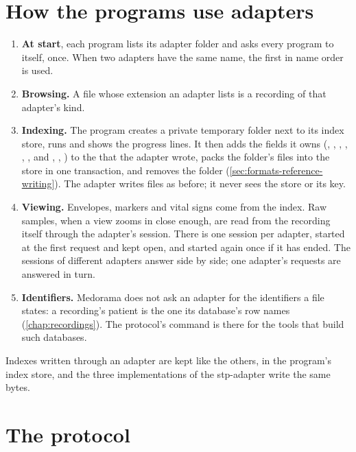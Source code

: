 \section{How the programs use adapters}
\label{sec:addons-use}

\begin{enumerate}
\item \textbf{At start}, each program lists its adapter folder and asks every
   program to  itself, once. When two adapters have the same
  name, the first in name order is used.
\item \textbf{Browsing.} A file whose extension an adapter lists is a recording of that adapter's
  kind.
\item \textbf{Indexing.} The program creates a private temporary folder next to its index store,
  runs  and shows the progress lines. It then adds the fields it owns
  (, , , , ,
  , and , , ) to the 
  that the adapter wrote, packs the folder's files into the store in one transaction, and removes
  the folder (\cref{sec:formats-reference-writing}). The adapter writes files as before; it never
  sees the store or its key.
\item \textbf{Viewing.} Envelopes, markers and vital signs come from the index. Raw samples, when
  a view zooms in close enough, are read from the recording itself through the adapter's
   session. There is one session per adapter, started at the first request and kept
  open, and started again once if it has ended. The sessions of different adapters answer side
  by side; one adapter's requests are answered in turn.
\item \textbf{Identifiers.} Medorama does not ask an adapter for the identifiers a file states: a
  recording's patient is the one its database's row names (\cref{chap:recordings}). The
  protocol's  command is there for the tools that build such databases.
\end{enumerate}
Indexes written through an adapter are kept like the others, in the program's index store, and
the three implementations of the stp-adapter write the same bytes.

\section{The protocol}
\label{sec:addons-protocol}

